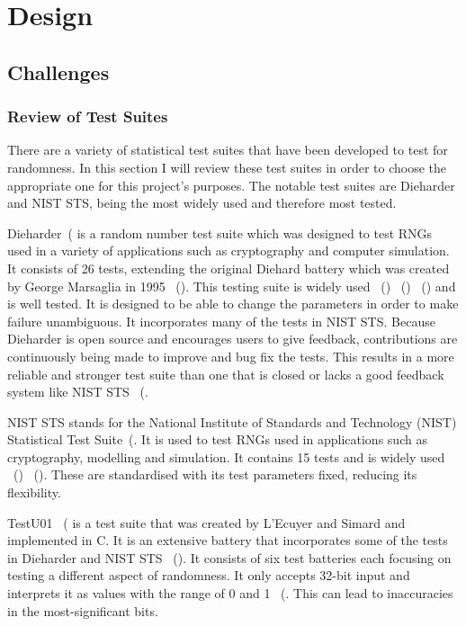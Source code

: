 \chapter{Design}

\section{Challenges}
\subsection{Review of Test Suites}
There are a variety of statistical test suites that have been developed to test for randomness. In this section I will review these test suites in order to choose the appropriate one for this project's purposes. The notable test suites are Dieharder and NIST STS, being the most widely used and therefore most tested. \newline

Dieharder~(\cite{dieharder} is a random number test suite which was designed to test RNGs used in a variety of applications such as cryptography and computer simulation. It consists of 26 tests, extending the original Diehard battery which was created by George Marsaglia in 1995 ~(\cite{10.1145/3447773}). This testing suite is widely used ~(\cite{10.1145/3527157}) ~(\cite{10.1145/3398726}) ~(\cite{10.1145/3624991}) and is well tested. It is designed to be able to change the parameters in order to make failure unambiguous. It incorporates many of the tests in NIST STS. Because Dieharder is open source and encourages users to give feedback, contributions are continuously being made to improve and bug fix the tests. This results in a more reliable and stronger test suite than one that is closed or lacks a good feedback system like NIST STS ~(\cite{dieharder}. \newline 

NIST STS stands for the National Institute of Standards and Technology (NIST) Statistical Test Suite~(\cite{nist}. It is used to test RNGs  used in applications such as cryptography, modelling and simulation. It contains 15 tests and is widely used ~(\cite{6236554}) ~(\cite{9209663}). These are standardised with its test parameters fixed, reducing its flexibility. \newline

TestU01 ~(\cite{testu01} is a test suite that was created by L’Ecuyer and Simard and implemented in C. It is an extensive battery that incorporates some of the tests in Dieharder and NIST STS ~(\cite{10.1145/3447773}). It consists of six test batteries each focusing on testing a different aspect of randomness. It only accepts 32-bit input and interprets it as values with the range of 0 and 1 ~(\cite{testu01}. This can lead to inaccuracies in the most-significant bits. \newline


